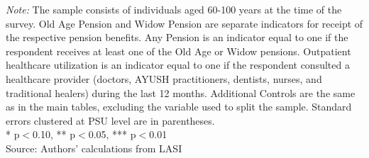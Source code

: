 \documentclass[
  11pt,
]{article}
\begin{document}
\begin{table}[H]
\begin{minipage}{0.95\textwidth}
\footnotesize \textit{Note:} The sample consists of individuals aged 60-100 years at the time of the survey. Old Age Pension and Widow Pension are separate indicators for receipt of the respective pension benefits. Any Pension is an indicator equal to one if the respondent receives at least one of the Old Age or Widow pensions. Outpatient healthcare utilization is an indicator equal to one if the respondent consulted a healthcare provider (doctors, AYUSH practitioners, dentists, nurses, and traditional healers) during the last 12 months. Additional Controls are the same as in the main tables, excluding the variable used to split the sample. Standard errors clustered at PSU level are in parentheses. \\ * p$<$0.10, ** p$<$0.05, *** p$<$0.01\\
Source: Authors' calculations from LASI
\end{minipage}
\end{table}
\end{document}
